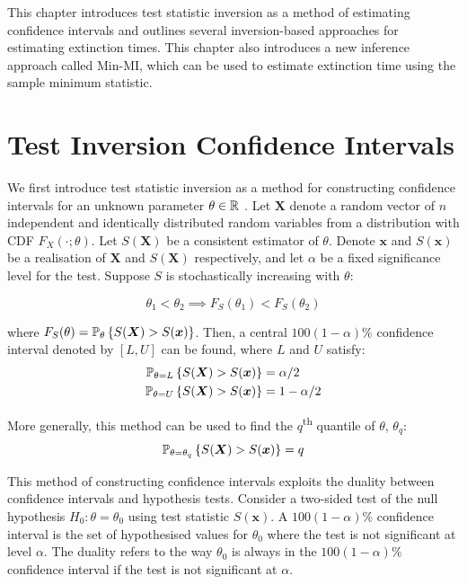 
This chapter introduces test statistic inversion as a method of estimating confidence intervals and outlines several inversion-based approaches for estimating extinction times. This chapter also introduces a new inference approach called Min-MI, which can be used to estimate extinction time using the sample minimum statistic.

\section{Test Inversion Confidence Intervals}

We first introduce test statistic inversion as a method for constructing confidence intervals for an unknown parameter $\theta \in \mathbb{R}$ \parencite{Carpenter1999}. Let $\bm{X}$ denote a random vector of $n$ independent and identically distributed random variables from a distribution with CDF $F_X (\cdot; \theta)$. Let $S(\bm{X})$ be a consistent estimator of $\theta$. Denote $\bm{x}$ and $S(\bm{x})$ be a realisation of $\bm{X}$ and $S(\bm{X})$ respectively, and let $\alpha$ be a fixed significance level for the test. Suppose $S$ is stochastically increasing with $\theta$:

\begin{equation}
    \theta_1 < \theta_2 \implies F_S(\theta_1) < F_S(\theta_2) 
\end{equation}

where $F_S(\theta) = \mathbb{P}_\theta\left\{S(\bm{X}) > S(\bm{x})\right\}$. Then, a central $100(1-\alpha)\%$ confidence interval denoted by $[L, U]$ can be found, where $L$ and $U$ satisfy: \begin{equation}
\begin{aligned}
    \mathbb{P}_{\theta = L}\left\{S(\bm{X}) > S(\bm{x})\right\} &= \alpha/2 \\
    \mathbb{P}_{\theta = U}\left\{S(\bm{X}) > S(\bm{x})\right\} &= 1 - \alpha/2
\end{aligned}
\end{equation}

More generally, this method can be used to find the $q$\textsuperscript{th} quantile of $\theta$, $\theta_q$: \begin{equation}\label{eq: inversion}
    \mathbb{P}_{\theta = \theta_q}\left\{S(\bm{X}) > S(\bm{x})\right\} = q
\end{equation}

This method of constructing confidence intervals exploits the duality between confidence intervals and hypothesis tests. Consider a two-sided test of the null hypothesis $H_0: \theta = \theta_0$ using test statistic $S(\bm{x})$. A $100(1-\alpha)\%$ confidence interval is the set of hypothesised values for $\theta_0$ where the test is not significant at level $\alpha$. The duality refers to the way $\theta_0$ is always in the $100(1-\alpha)\%$ confidence interval if the test is not significant at $\alpha$.

